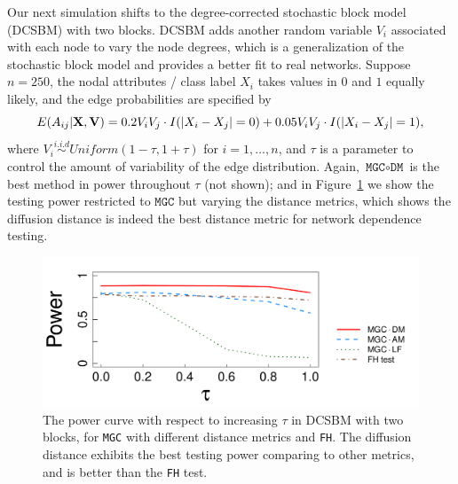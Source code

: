 \documentclass[11pt]{article}
\theoremstyle{definition}
\begin{document}
Our next simulation shifts to the degree-corrected stochastic block model (DCSBM) with two blocks. DCSBM adds another random variable $V_{i}$ associated with each node to vary the node degrees, which is a generalization of the stochastic block model and provides a better fit to real networks. Suppose $n=250$, the nodal attributes / class label $X_i$ takes values in $0$ and $1$ equally likely, and the edge probabilities are specified by  
\vspace*{-0.4cm}
\begin{equation}
E( A_{ij} | \mathbf{X}, \mathbf{V} )  = 0.2 V_{i} V_{j} \cdot I ( |X_{i} - X_{j}| = 0 ) + 0.05 V_{i} V_{j} \cdot I(|X_{i} - X_{j}| = 1),
\label{eq:tau}
\vspace*{-0.4cm}
\end{equation} 
where $V_{i} \overset{i.i.d}{\sim} Uniform(1 - \tau, 1 + \tau)$ for $i = 1, \ldots, n$, and $\tau$ is a parameter to control the amount of variability of the edge distribution. Again, $\texttt{MGC} \circ \texttt{DM}$ is the best method in power throughout $\tau$ (not shown); and in Figure~\ref{fig:dcSBM} we show the testing power restricted to $\texttt{MGC}$ but varying the distance metrics, which shows the diffusion distance is indeed the best distance metric for network dependence testing.

\begin{figure}[ht]
	\centering
	\includegraphics[width=0.7\linewidth]{tau_short.pdf}
	\caption{The power curve with respect to increasing $\tau$ in DCSBM with two blocks, for \texttt{MGC} with different distance metrics and \texttt{FH}. The diffusion distance exhibits the best testing power comparing to other metrics, and is better than the \texttt{FH} test.}
	\label{fig:dcSBM}
	\vspace*{-0.5cm}
\end{figure}
\end{document}
